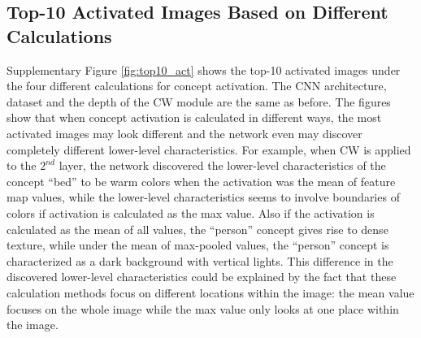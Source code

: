 \documentclass{article}
\begin{document}
\subsection{Top-10 Activated Images Based on Different Calculations}
\label{sec:top10_act}
Supplementary Figure  \ref{fig:top10_act} shows the top-10 activated images under the four different calculations for concept activation. The CNN architecture, dataset and the depth of the CW module are the same as before. The figures show that when concept activation is calculated in different ways, the most activated images may look different and the network even may discover completely different lower-level characteristics. For example, when CW is applied to the $2^{nd}$ layer, the network discovered the lower-level characteristics of the concept ``bed'' to be warm colors when the activation was the mean of feature map values, while the lower-level characteristics seems to involve boundaries of colors if activation is calculated as the max value. Also if the activation is calculated as the mean of all values, the ``person'' concept gives rise to dense texture, while under the mean of max-pooled values, the ``person'' concept is characterized as a dark background with vertical lights. This difference in the discovered lower-level characteristics could be explained by the fact that these calculation methods focus on different locations within the image: the mean value focuses on the whole image while the max value only looks at one place within the image.
\end{document}

